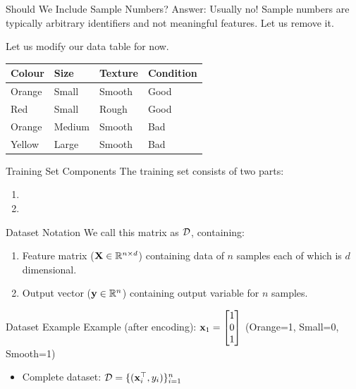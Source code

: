 \documentclass[dvipsnames]{beamer}
\begin{document}
\begin{frame}{Should We Include Sample Numbers?}
Answer: Usually no! Sample numbers are typically arbitrary identifiers and not meaningful features. Let us remove it.

\pause Let us modify our data table for now.

\begin{table}[]
	\begin{tabular}{|l|l|l||l|}
		\hline 
		\textbf{Colour} & \textbf{Size} & \textbf{Texture} & \textbf{Condition} \\ \hline 
		Orange & Small & Smooth  & Good      \\
		Red    & Small  & Rough  & Good \\
		Orange & Medium & Smooth & Bad \\
		Yellow & Large  & Smooth & Bad \\ \hline 

	\end{tabular}
\end{table}
\end{frame}

\begin{frame}{Training Set Components}
The training set consists of two parts:
\begin{enumerate}
	\item \pause \color{Lavender}{Features (Input Variables)}
	\item \pause \color{Tan}{Output or Response Variable}
\end{enumerate}
\end{frame}

\begin{frame}{Dataset Notation}
We call this matrix as $\mathcal{D}$, containing:
\begin{enumerate}
	\item Feature matrix ($\mathbf{X} \in \mathbb{R}^{n \times d}$) containing data of $n$ samples each of which is $d$ dimensional.
	\item Output vector ($\mathbf{y} \in \mathbb{R}^n$) containing output variable for $n$ samples.
\end{enumerate}

\end{frame}

\begin{frame}{Dataset Example}
Example (after encoding): $\mathbf{x}_1 = \begin{bmatrix}
	1 \\ 
	0 \\
	1 \\
	\end{bmatrix}$ (Orange=1, Small=0, Smooth=1)

\begin{itemize}
	\item \pause Complete dataset: $\mathcal{D} = \{(\mathbf{x}_i^\top, y_i)\}_{i=1}^n$
\end{itemize}

\end{frame}
\end{document}
